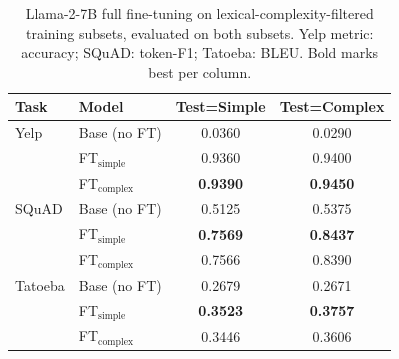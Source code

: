 \begin{table}[t]
\centering
\caption{Llama-2-7B full fine-tuning on lexical-complexity-filtered training subsets, evaluated on both subsets. Yelp metric: accuracy; SQuAD: token-F1; Tatoeba: BLEU. Bold marks best per column.}
\label{tab:tc_full_ft}
\begin{tabular}{llcc}
\toprule
Task & Model & Test=Simple & Test=Complex \\
\midrule
Yelp & Base (no FT) & 0.0360 & 0.0290 \\
 & FT$_{\text{simple}}$ & 0.9360 & 0.9400 \\
 & FT$_{\text{complex}}$ & \textbf{0.9390} & \textbf{0.9450} \\
\midrule
SQuAD & Base (no FT) & 0.5125 & 0.5375 \\
 & FT$_{\text{simple}}$ & \textbf{0.7569} & \textbf{0.8437} \\
 & FT$_{\text{complex}}$ & 0.7566 & 0.8390 \\
\midrule
Tatoeba & Base (no FT) & 0.2679 & 0.2671 \\
 & FT$_{\text{simple}}$ & \textbf{0.3523} & \textbf{0.3757} \\
 & FT$_{\text{complex}}$ & 0.3446 & 0.3606 \\
\bottomrule
\end{tabular}
\end{table}
